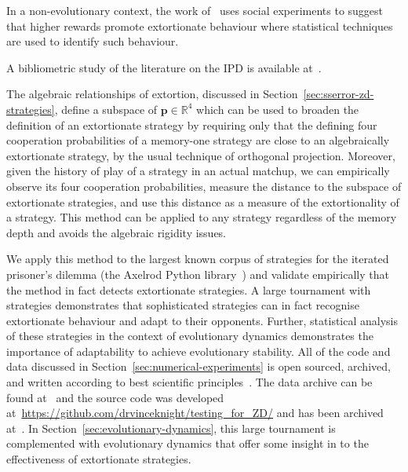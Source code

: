 \documentclass[a4paper]{article}
\begin{document}
In a non-evolutionary context, the work of~\cite{becks2019extortion} uses social
experiments to suggest that higher rewards promote extortionate
behaviour where statistical techniques are used to identify such behaviour.

A bibliometric study of the literature on the IPD is available
at~\cite{glynatsi2021bibliometric}.

The algebraic relationships of extortion, discussed in
Section~\ref{sec:sserror-zd-strategies}, define a subspace of
\(\textbf{p}\in\mathbb{R}^4\) which can be used to broaden the definition of an extortionate
strategy by requiring only that the defining four cooperation probabilities of a
memory-one strategy are close to an algebraically extortionate strategy, by the usual
technique of orthogonal projection. Moreover, given the history of play of a
strategy in an actual matchup, we can empirically observe its four
cooperation probabilities, measure the distance to the subspace of extortionate
strategies, and use this distance as a measure of the extortionality of a
strategy. This method can be applied to any strategy regardless of the memory
depth and avoids the algebraic rigidity issues.

We apply this method to the largest known corpus of strategies for the iterated
prisoner's dilemma (the Axelrod Python library~\cite{Knight2016, Knight2018})
and validate empirically that the method in fact detects extortionate strategies.
A large tournament with 
strategies demonstrates that sophisticated
strategies can in fact recognise extortionate behaviour and adapt to their
opponents. Further, statistical analysis of these strategies in the context of
evolutionary dynamics demonstrates the importance of adaptability to achieve
evolutionary stability. All of the code and data discussed in
Section~\ref{sec:numerical-experiments} is open sourced, archived, and written
according to best scientific principles~\cite{Wilson2014}. The data archive can
be found at~\cite{vincent_knight_2018_1297075} and the source code was developed
at~\url{https://github.com/drvinceknight/testing_for_ZD/} and has been archived
at~\cite{vincent_knight_2019_2598534}. In
Section~\ref{sec:evolutionary-dynamics}, this large tournament is complemented
with evolutionary dynamics that offer some insight in to the
effectiveness of extortionate strategies.
\end{document}

